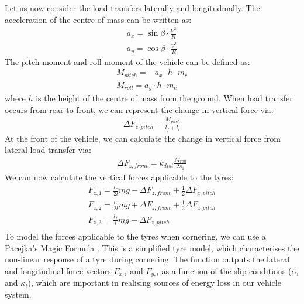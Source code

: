 \documentclass[11pt]{article}
\numberwithin{equation}{section}
\begin{document}
Let us now consider the load transfers laterally and longitudinally. The acceleration of the centre of mass can be written as:
\begin{gather}
    a_x = \sin\beta \cdot \frac{V^2}{R}\\
    a_y = \cos\beta \cdot \frac{V^2}{R}
\end{gather}
The pitch moment and roll moment of the vehicle can be defined as:
\begin{gather}
    M_{pitch} = -a_x \cdot h \cdot m_c\\
    M_{roll} = a_y \cdot h \cdot m_c
\end{gather}
where $h$ is the height of the centre of mass from the ground. When load transfer occurs from rear to front, we can represent the change in vertical force via:
\begin{gather}
    \Delta F_{z,pitch} = \frac{M_{pitch}}{l_f + l_r}
\end{gather}
At the front of the vehicle, we can calculate the change in vertical force from lateral load transfer via:
\begin{gather}
    \Delta F_{z,front} = k_{dist} \frac{M_{roll}}{2s_1}
\end{gather}
We can now calculate the vertical forces applicable to the tyres:
\begin{gather}
    F_{z,1} = \frac{l_r}{2l}mg - \Delta F_{z,front} + \frac{1}{2} \Delta F_{z,pitch}\\
    F_{z,2} = \frac{l_r}{2l}mg + \Delta F_{z,front} + \frac{1}{2} \Delta F_{z,pitch}\\
    F_{z,3} = \frac{l_f}{l}mg - \Delta F_{z,pitch}\\
\end{gather}
To model the forces applicable to the tyres when cornering, we can use a Pacejka's Magic Formula \citep{pacejka2012tire}. This is a simplified tyre model, which characterises the non-linear response of a tyre during cornering. The function outputs the lateral and longitudinal force vectors $F_{x,i}$ and $F_{y,i}$ as a function of the slip conditions ($\alpha_i$ and $\kappa_i$), which are important in realising sources of energy loss in our vehicle system.
\end{document}
